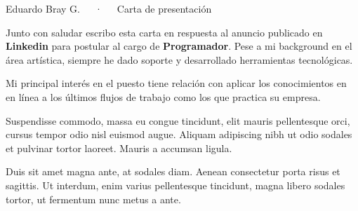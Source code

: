 \documentclass[11pt, a4paper]{awesome-cv}
\begin{document}
\makecvheader[R]

\makecvfooter
  {}
  {Eduardo Bray G.~~~·~~~Carta de presentación}
  {}

\makelettertitle

\begin{cvletter}


Junto con saludar escribo esta carta en respuesta al anuncio publicado en
\textbf{Linkedin} para postular al cargo de \textbf{Programador}. Pese a mi
background en el área artística, siempre he dado soporte y desarrollado
herramientas tecnológicas.

Mi principal interés en el puesto tiene relación con aplicar los conocimientos
en  en línea a los últimos flujos de trabajo como los que practica su
empresa.


Suspendisse commodo, massa eu congue tincidunt, elit mauris pellentesque orci,
cursus tempor odio nisl euismod augue. Aliquam adipiscing nibh ut odio sodales
et pulvinar tortor laoreet. Mauris a accumsan ligula.


Duis sit amet magna ante, at sodales diam. Aenean consectetur porta risus et
sagittis. Ut interdum, enim varius pellentesque tincidunt, magna libero sodales
tortor, ut fermentum nunc metus a ante.

\end{cvletter}


\end{document}
